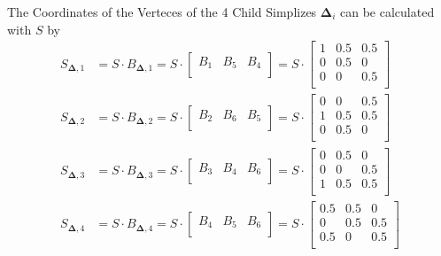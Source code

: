 \documentclass{mitschrift}
\newcommand{\simplex}{\boldsymbol{\Delta}}
\begin{document}
The Coordinates of the Verteces of the 4 Child Simplizes $\simplex_i$ can be calculated with $S$ by \begin{align}
    S_{\simplex,1} &= S \cdot B_{\simplex,1} = S \cdot \begin{bmatrix}
        B_1 & B_5 & B_4 \\
    \end{bmatrix} = S \cdot \begin{bmatrix}
        1 & 0.5 & 0.5 \\
        0 & 0.5 & 0 \\
        0 & 0 & 0.5 \\
    \end{bmatrix} \\
    S_{\simplex,2} &= S \cdot B_{\simplex,2} = S \cdot \begin{bmatrix}
        B_2 & B_6 & B_5 \\
    \end{bmatrix} = S \cdot \begin{bmatrix}
        0 & 0   & 0.5 \\
        1 & 0.5 & 0.5 \\
        0 & 0.5 & 0   \\
    \end{bmatrix} \\
    S_{\simplex,3} &= S \cdot B_{\simplex,3} = S \cdot \begin{bmatrix}
        B_3 & B_4 & B_6 \\
    \end{bmatrix} = S \cdot \begin{bmatrix}
        0 & 0.5 & 0   \\
        0 & 0   & 0.5 \\
        1 & 0.5 & 0.5 \\
    \end{bmatrix} \\
    S_{\simplex,4} &= S \cdot B_{\simplex,4} = S \cdot \begin{bmatrix}
        B_4 & B_5 & B_6 \\
    \end{bmatrix} = S \cdot \begin{bmatrix}
        0.5 & 0.5 & 0   \\
        0   & 0.5 & 0.5 \\
        0.5 & 0   & 0.5 \\
    \end{bmatrix}
\end{align}

\pagebreak
\end{document}
